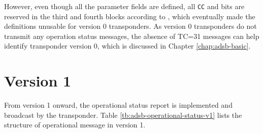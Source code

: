 However, even though all the parameter fields are defined, all 
\texttt{CC} and  bits are reserved in the third and fourth blocks according to \cite{icao9871v1}, which eventually made the definitions unusable for version 0 transponders. As version 0 transponders do not transmit any operation status messages, the absence of TC=31 messages can help identify transponder version 0, which is discussed in Chapter \ref{chap:adsb-basic}.

\section{Version 1}

From version 1 onward, the operational status report is implemented and broadcast by the transponder. Table \ref{tb:adsb-operational-status-v1} lists the structure of operational message in version 1.


